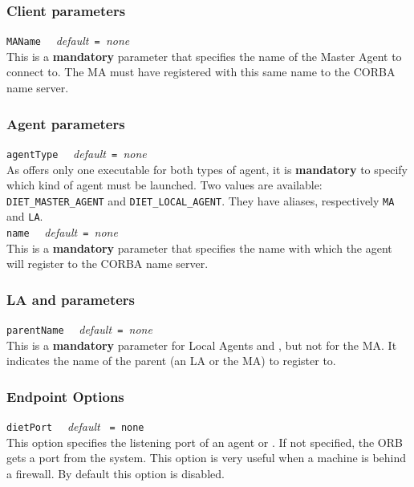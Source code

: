 \subsubsection{Client parameters}

\noindent
\texttt{MAName} \ \ \emph{default}\texttt{ = }\emph{none}\\ This is a
\textbf{mandatory} parameter that specifies the name of the Master
Agent to connect to. The MA must have registered with this same name
to the CORBA name server.


\subsubsection{Agent parameters}

\noindent
\texttt{agentType} \ \ \emph{default}\texttt{ = }\emph{none}\\
As \diet offers only one executable for both types of agent, it is
\textbf{mandatory} to specify which kind of agent must be launched. Two values
are available: \texttt{DIET\_MASTER\_AGENT} and \texttt{DIET\_LOCAL\_AGENT}.
They have aliases, respectively \texttt{MA} and \texttt{LA}.
\\

\noindent
\texttt{name} \ \ \emph{default}\texttt{ = }\emph{none}\\ This is a
\textbf{mandatory} parameter that specifies the name with which the
agent will register to the CORBA name server.


\subsubsection{LA and \sed parameters}

\noindent
\texttt{parentName} \ \ \emph{default}\texttt{ = }\emph{none}\\ This
is a \textbf{mandatory} parameter for Local Agents and \seds, but 
not for the MA.  It indicates the name of the parent (an LA or the
MA) to register to.

\subsubsection{Endpoint Options}

\noindent
\texttt{dietPort} \ \ \emph{default} \texttt{ = none }\\ This
option specifies the listening port of an agent or \sed. If not
specified, the ORB gets a port from the system. This option is very
useful when a machine is behind a firewall. By default this option
is disabled.\\

